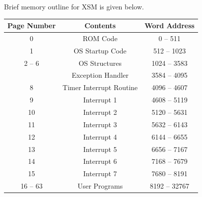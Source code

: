 \documentclass[11pt]{report}
\begin{document}
Brief memory outline for XSM is given below.
\begin{center}
\begin{tabular}{|c|c|c|}
\hline \textbf{Page Number} & \textbf{Contents} & \textbf{Word Address}  \\ 
\hline 0 & ROM Code &  0 -- 511\\ 
1 & OS Startup Code & 512 -- 1023 \\ 
2 -- 6 & OS Structures  &  1024 -- 3583\\ 
 \rowcolor{gray!15}
\hline 7 & Exception Handler  &  3584 -- 4095\\ 
 \rowcolor{gray!15}
 8 & Timer Interrupt Routine  &  4096 -- 4607\\ 
 \rowcolor{gray!15}
 9 & Interrupt 1  &  4608 -- 5119\\ 
 \rowcolor{gray!15}
10 & Interrupt 2  &  5120 -- 5631\\ 
 \rowcolor{gray!15}
 11 & Interrupt 3  &  5632 -- 6143\\ 
 \rowcolor{gray!15}
 12 & Interrupt 4  &  6144 -- 6655\\ 
 \rowcolor{gray!15}
 13 & Interrupt 5  &  6656 -- 7167\\ 
 \rowcolor{gray!15}
 14 & Interrupt 6  &  7168 -- 7679\\
 \rowcolor{gray!15} 
 15 & Interrupt 7  &  7680 -- 8191\\ 
\hline 16 -- 63 & User Programs & 8192 -- 32767\\
\hline
\end{tabular} 
\end{center}
\end{document}
